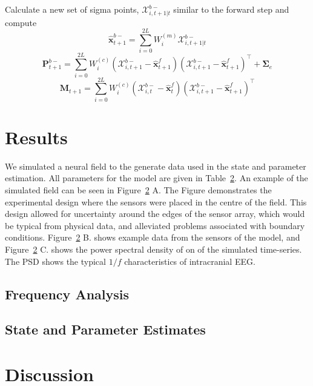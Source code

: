 \documentclass[12pt]{iopart}		%
\begin{document}
\begin{algorithm}
\begin{algorithmic}[1]
\begin{equation*}
\end{equation*}
\State Calculate a new set of  sigma points, $\mathcal X_{i,t+1|t}^{b-}$ similar to the forward step and compute
\begin{equation*}
 \hat{\mathbf x}_{t+1}^{b-}=\sum_{i=0}^{2L} W_i^{(m)}\mathcal X_{i,t+1|t}^{b-}
\end{equation*}
\begin{equation*}
 \mathbf P_{t +1}^{b-}=\sum_{i=0}^{2L} W_i^{(c)}(\mathcal X_{i,t+1}^{b-}-\hat{\mathbf x}_{t +1}^{f})(\mathcal X_{i,t+1}^{b-}-\hat{\mathbf x}_{t +1}^{f})^\top+\boldsymbol \Sigma_e
\end{equation*}
\begin{equation*}
 \mathbf M_{t +1}=\sum_{i=0}^{2L} W_i^{(c)}(\mathcal X_{i,t}^{b-}-\hat{\mathbf x}_{t}^{f})(\mathcal X_{i,t+1}^{b-}-\hat{\mathbf x}_{t+1}^{f})^\top
\end{equation*}
\end{algorithmic}
\end{algorithm}
\section{Results}
We simulated a neural field to the generate data used in the state and parameter estimation. All parameters for the model are given in Table~\ref{}. An example of the simulated field can be seen in Figure~\ref{} A. The Figure demonstrates the experimental design where the sensors were placed in the centre of the field. This design allowed for uncertainty around the edges of the sensor array, which would be typical from physical data, and alleviated problems associated with boundary conditions. Figure~\ref{} B. shows example data from the sensors of the model, and Figure~\ref{} C. shows the power spectral density of on of the simulated time-series. The PSD shows the typical $1/f$ characteristics of intracranial EEG.

\subsection{Frequency Analysis}

\subsection{State and Parameter Estimates}


\section{Discussion}
\end{document}
